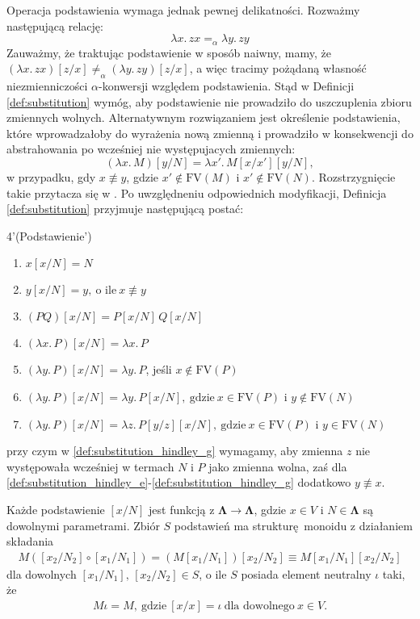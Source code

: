 Operacja podstawienia wymaga jednak pewnej delikatności. Rozważmy następującą relację:
\[
  \lambda x.\,zx=_{\alpha}\lambda y.\,zy
\]
Zauważmy, że traktując podstawienie w sposób naiwny, mamy, że \((\lambda x.\,zx)[z/x]\neq_{\alpha}(\lambda y.\,zy)[z/x]\), a więc tracimy pożądaną własność niezmienniczości \(\alpha\)-konwersji względem podstawienia. Stąd w Definicji \ref{def:substitution} wymóg, aby podstawienie nie prowadziło do uszczuplenia zbioru zmiennych wolnych. Alternatywnym rozwiązaniem jest określenie podstawienia, które wprowadzałoby do wyrażenia nową zmienną i prowadziło w konsekwencji do abstrahowania po wcześniej nie występujacych zmiennych:
\[
  (\lambda x.\,M)[y/N] = \lambda x'.\,M[x/x'][y/N],
\]
w przypadku, gdy \(x\not\equiv y\), gdzie \(x'\not\in\mathrm{FV}(M)\) i \(x'\not\in\mathrm{FV}(N)\). Rozstrzygnięcie takie przytacza się w \cite{Hindley:2008:LCI:1388400,}. Po uwzględneniu odpowiednich modyfikacji, Definicja \ref{def:substitution} przyjmuje następującą postać:
\begin{customdef}{4'}(Podstawienie')\label{def:untyped_substitution_hindley}
  \begin{enumerate}[label={(S'\arabic*)}, ref={(S'\arabic*)}]
    \setlength\itemsep{0em}
    \item \(x[x/N] = N\)
    \item \(y[x/N] = y,\ \text{o ile}\ x\not\equiv y\)
    \item \((PQ)[x/N] = P[x/N]\,Q[x/N]\)
    \item \((\lambda x.\, P)[x/N] = \lambda x.\,P\)
    \item \((\lambda y.\, P)[x/N] = \lambda y.\,P\), jeśli \(x\not\in\mathrm{FV}(P)\)\label{def:substitution_e}\label{def:substitution_hindley_e}
    \item \((\lambda y.\, P)[x/N] = \lambda y.\,P[x/N],\ \text{gdzie}\ x\in\mathrm{FV}(P)\) i \(y\not\in\mathrm{FV}(N)\)\label{def:substitution_hindley_f}
    \item \((\lambda y.\, P)[x/N] = \lambda z.\,P[y/z][x/N],\ \text{gdzie}\ x\in\mathrm{FV}(P)\) i \(y\in\mathrm{FV}(N)\)\label{def:substitution_hindley_g}
  \end{enumerate}
  przy czym w \ref{def:substitution_hindley_g} wymagamy, aby zmienna \(z\) nie występowała wcześniej w termach \(N\) i \(P\) jako zmienna wolna, zaś dla \ref{def:substitution_hindley_e}-\ref{def:substitution_hindley_g} dodatkowo \(y\not\equiv x\).
\end{customdef}
\begin{uwaga}
Każde podstawienie \([x/N]\) jest funkcją z \(\mathbf{\Lambda}\to\mathbf{\Lambda}\), gdzie \(x\in V\) i \(N\in\mathbf{\Lambda}\) są dowolnymi parametrami. Zbiór \(S\) podstawień ma strukturę monoidu z działaniem składania
  \begin{align*}
    M([x_2/N_2]\circ[x_1/N_1]) = (M[x_1/N_1])[x_2/N_2] \equiv M[x_1/N_1][x_2/N_2]
  \end{align*}
  dla dowolnych \([x_1/N_1],\,[x_2/N_2]\in S\), o ile \(S\) posiada element neutralny \(\iota\) taki, że
  \begin{align*}
    M \iota = M,\ \text{gdzie}\ [x/x]=\iota\ \text{dla dowolnego}\ x\in V.
  \end{align*}
\end{uwaga}

